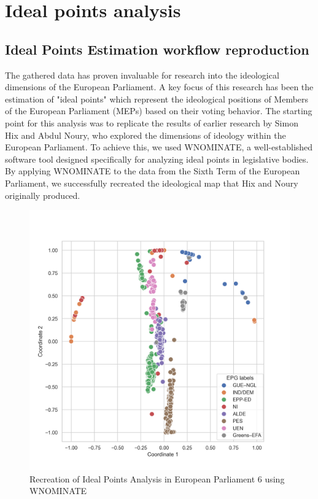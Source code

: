 \documentclass{article}
\begin{document}
    \section{Ideal points analysis}

    \subsection{Ideal Points Estimation workflow reproduction}
    The gathered data has proven invaluable for research into the ideological dimensions of the European Parliament. A
    key focus of this research has been the estimation of "ideal points" which represent the ideological positions of
    Members of the European Parliament (MEPs) based on their voting behavior. The starting point for this analysis was
    to replicate the results of earlier research by Simon Hix and Abdul Noury, who explored the dimensions of ideology
    within the European Parliament. To achieve this, we used WNOMINATE, a well-established software tool designed
    specifically for analyzing ideal points in legislative bodies. By applying WNOMINATE to the data from the Sixth Term
    of the European Parliament, we successfully recreated the ideological map that Hix and Noury originally produced.
    \begin{figure}[H]
        \centering
        \includegraphics[width=1\textwidth]{Graphs/WNOMINATE2d.png}
        \caption{Recreation of Ideal Points Analysis in European Parliament 6 using WNOMINATE}
        \label{fig:WNOMINATE 6}
    \end{figure}
\end{document}
